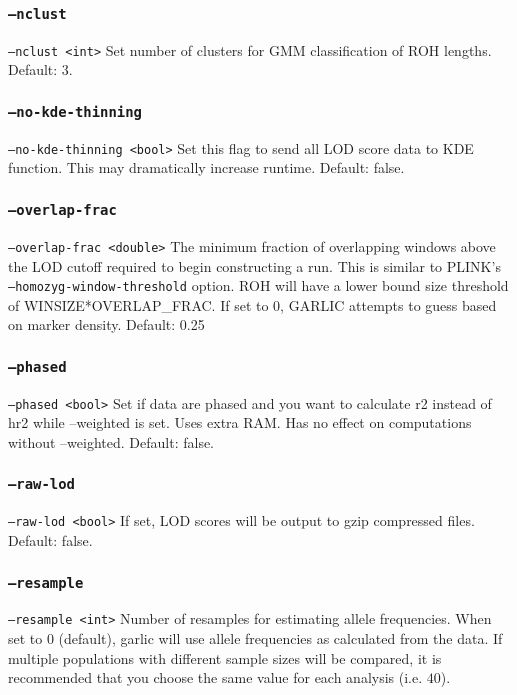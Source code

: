\documentclass[12pt]{article}%
\begin{document}
\subsubsection{{\tt --nclust}}
{\tt --nclust <int>} Set number of clusters for GMM classification of ROH lengths. Default: 3.

\subsubsection{{\tt --no-kde-thinning}}
{\tt --no-kde-thinning <bool>} Set this flag to send all LOD score data to KDE function. This may dramatically increase runtime. Default: false.

\subsubsection{{\tt --overlap-frac}}
{\tt --overlap-frac <double>} The minimum fraction of overlapping windows above the LOD cutoff required to begin constructing a run. This is similar to PLINK's {\tt --homozyg-window-threshold} option. ROH will have a lower bound size threshold of WINSIZE*OVERLAP\_FRAC. If set to 0, GARLIC attempts to guess based on marker density. Default: 0.25

\subsubsection{{\tt --phased}}
{\tt --phased <bool>} Set if data are phased and you want to calculate r2 instead of hr2 while --weighted is set.
Uses extra RAM. Has no effect on computations without --weighted. Default: false.

\subsubsection{{\tt --raw-lod}}
{\tt --raw-lod <bool>} If set, LOD scores will be output to gzip compressed files. Default: false.

\subsubsection{{\tt --resample}}
{\tt --resample <int>} Number of resamples for estimating allele frequencies. When set to $0$ (default), garlic will use allele frequencies as calculated from the data. If multiple populations with different sample sizes will be compared, it is recommended that you choose the same value for each analysis (i.e. $40$).
\end{document}
